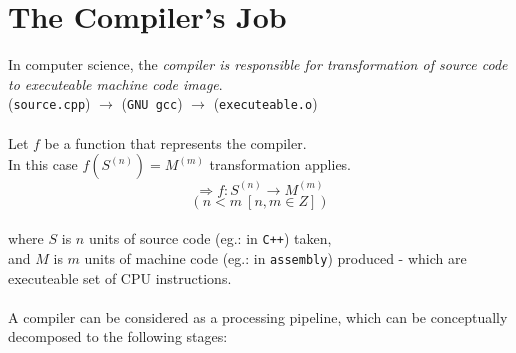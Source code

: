 \documentclass{article}
\begin{document}
 \section*{The Compiler's Job}
 In computer science, the \textsl{compiler is responsible for transformation of source code to executeable machine code image}.
 \\
  (\texttt{source.cpp}) $\rightarrow$ (\texttt{GNU gcc}) $\rightarrow$ (\texttt{executeable.o})
 \\
 \\
 Let $f$ be a function that represents the compiler. \\
 In this case $f(S^{(n)}) = M^{(m)}$ transformation applies.
 \\
 $$\Rightarrow f: S^{(n)} \rightarrow M^{(m)}$$
 $$(n < m\  [n,m \in Z])$$
 \\
 where $S$ is $n$ units of source code (eg.: in \texttt{C++}) taken, 
 \\
 and $M$ is $m$ units of machine code (eg.: in \texttt{assembly}) produced \-- which are executeable set of CPU instructions.
 \\
 \\
 A compiler can be considered as a processing pipeline, which can be conceptually decomposed to the following stages:
\end{document}
